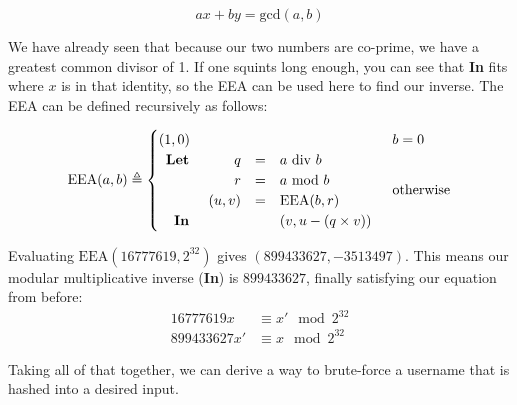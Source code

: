 \documentclass[14pt,a4paper,notitlepage]{extarticle}
\begin{document}
                \begin{equation*}
                    ax + by = \text{gcd}(a, b)
                \end{equation*}

                We have already seen that because our two numbers are co-prime, we have a
                greatest common divisor of 1. If one squints long enough, you can see that
                \textbf{In} fits where $x$ is in that identity, so the EEA can be used here to
                find our inverse. The EEA can be defined recursively as follows:

                \begin{equation*}
                    \text{EEA}(a, b) \triangleq \begin{cases}
                        (1, 0) & b = 0\\
                        \begin{array}{rrcl}
                            \text{\textbf{Let }} & q & = & a\ \text{div}\ b \\
                            & r & = & a\ \text{mod}\ b \\
                            & (u, v) & = & \text{EEA}(b, r) \\
                            \text{\textbf{In }} & & & (v, u - (q \times v))
                        \end{array} & \text{otherwise}
                    \end{cases}
                \end{equation*}

                Evaluating $\text{EEA}(16777619, 2^{32})$ gives $(899433627,-3513497)$.
                This means our modular multiplicative inverse (\textbf{In}) is $899433627$, finally
                satisfying our equation from before:
                \begin{align*}
                    16777619x &\equiv x' \mod 2^{32}\\
                    899433627 x' &\equiv x \mod 2^{32}
                \end{align*}

                \noindent Taking all of that together, we can derive a way to brute-force a username
                that is hashed into a desired input.

                \pagebreak
\end{document}
